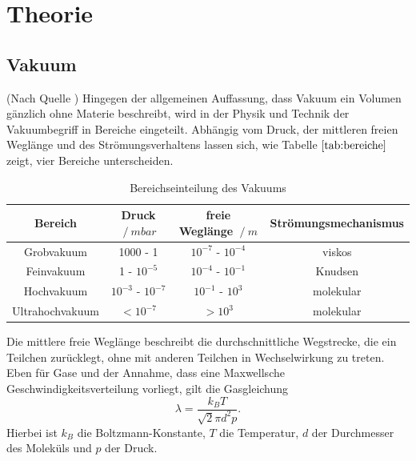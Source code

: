 \section{Theorie}
\subsection{Vakuum}
(Nach Quelle \cite{vakuum})
Hingegen der allgemeinen Auffassung, dass Vakuum ein Volumen gänzlich ohne Materie beschreibt, wird in der Physik und Technik
der Vakuumbegriff in Bereiche eingeteilt.
Abhängig vom Druck, der mittleren freien Weglänge und des Strömungsverhaltens lassen sich, wie Tabelle $\ref{tab:bereiche}$ zeigt, vier Bereiche unterscheiden.

\begin{table}[!hht]
\begin{tabular}{c c c c}
 Bereich & Druck $\:/\: mbar$ & freie Weglänge $\:/\: m$ & Strömungsmechanismus \\
 \midrule
 Grobvakuum & 1000 - 1 & $10^{-7}$ - $10^{-4}$ & viskos \\
 Feinvakuum & 1 - $10^{-5}$ & $10^{-4}$ - $10^{-1}$ & Knudsen \\
 Hochvakuum & $10^{-3}$ - $10^{-7}$ & $10^{-1}$ - $10^3$ & molekular \\
 Ultrahochvakuum & $< 10^{-7}$ & $> 10^3$ & molekular \\
\end{tabular}
\caption{Bereichseinteilung des Vakuums}
\label{tab:bereiche}
\end{table}

Die mittlere freie Weglänge beschreibt die durchschnittliche Wegstrecke, die ein Teilchen zurücklegt, ohne mit anderen Teilchen in Wechselwirkung zu treten.
Eben für Gase und der Annahme, dass eine Maxwellsche Geschwindigkeitsverteilung vorliegt, gilt die Gasgleichung
\begin{equation}
  \lambda = \frac{k_B T}{\sqrt{2}\pi d^2p}.
\end{equation}
Hierbei ist $k_B$ die Boltzmann-Konstante, $T$ die Temperatur, $d$ der Durchmesser des Moleküls und $p$ der Druck.
